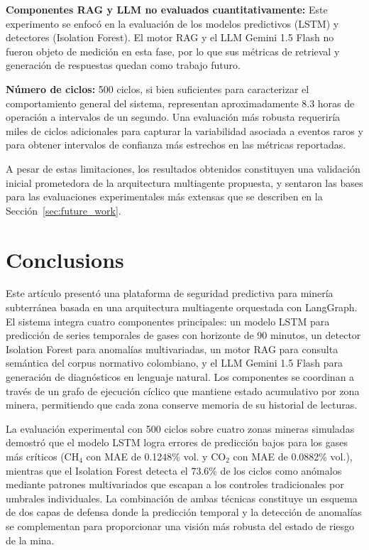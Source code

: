 \documentclass[journal,onecolumn]{IEEEtran}
\begin{document}
\textbf{Componentes RAG y LLM no evaluados cuantitativamente:} Este experimento se enfocó en la evaluación de los modelos predictivos (LSTM) y detectores (Isolation Forest). El motor RAG y el LLM Gemini 1.5 Flash no fueron objeto de medición en esta fase, por lo que sus métricas de retrieval y generación de respuestas quedan como trabajo futuro.

\textbf{Número de ciclos:} 500 ciclos, si bien suficientes para caracterizar el comportamiento general del sistema, representan aproximadamente 8.3 horas de operación a intervalos de un segundo. Una evaluación más robusta requeriría miles de ciclos adicionales para capturar la variabilidad asociada a eventos raros y para obtener intervalos de confianza más estrechos en las métricas reportadas.

A pesar de estas limitaciones, los resultados obtenidos constituyen una validación inicial prometedora de la arquitectura multiagente propuesta, y sentaron las bases para las evaluaciones experimentales más extensas que se describen en la Sección~\ref{sec:future_work}.

\section{Conclusions}
\label{sec:conclusions}

Este artículo presentó una plataforma de seguridad predictiva para minería subterránea basada en una arquitectura multiagente orquestada con LangGraph. El sistema integra cuatro componentes principales: un modelo LSTM para predicción de series temporales de gases con horizonte de 90 minutos, un detector Isolation Forest para anomalías multivariadas, un motor RAG para consulta semántica del corpus normativo colombiano, y el LLM Gemini 1.5 Flash para generación de diagnósticos en lenguaje natural. Los componentes se coordinan a través de un grafo de ejecución cíclico que mantiene estado acumulativo por zona minera, permitiendo que cada zona conserve memoria de su historial de lecturas.

La evaluación experimental con 500 ciclos sobre cuatro zonas mineras simuladas demostró que el modelo LSTM logra errores de predicción bajos para los gases más críticos (CH$_4$ con MAE de 0.1248\% vol. y CO$_2$ con MAE de 0.0882\% vol.), mientras que el Isolation Forest detecta el 73.6\% de los ciclos como anómalos mediante patrones multivariados que escapan a los controles tradicionales por umbrales individuales. La combinación de ambas técnicas constituye un esquema de dos capas de defensa donde la predicción temporal y la detección de anomalías se complementan para proporcionar una visión más robusta del estado de riesgo de la mina.
\end{document}
